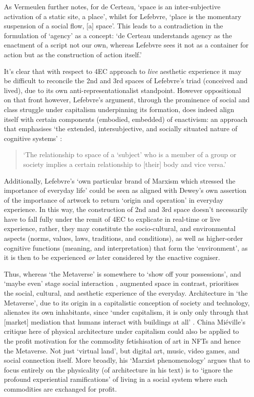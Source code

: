 As Vermeulen further notes, for de Certeau, `space is an inter-subjective activation of a static site, a place', whilst for Lefebvre, `place is the momentary suspension of a social flow, [a] space'. This leads to a contradiction in the formulation of `agency' as a concept: `de Certeau understands agency as the enactment of a script not our own, whereas Lefebvre sees it not as a container for action but as the construction of action itself.' 

It's clear that with respect to 4EC approach to \textit{live} aesthetic experience it may be difficult to reconcile the 2nd and 3rd spaces of Lefebvre's triad (conceived and lived), due to its own anti-representationalist standpoint. However oppositional on that front however, Lefebvre's argument, through the prominence of social and class struggle under capitalism underpinning its formation, does indeed align itself with certain components (embodied, embedded) of enactivism: an approach that emphasises `the extended, intersubjective, and socially situated nature of cognitive systems' \citep[p. 6]{gallagher2017}: 
\begin{quote}
    `The relationship to space of a `subject' who is a member of a group or society implies a certain relationship to [their] body and vice versa.' \cite[p. 40]{lefebvre1991}
\end{quote}
Additionally, Lefebvre's `own particular brand of Marxism which stressed the importance of everyday life' \citep[p. 8]{merrifield1993} could be seen as aligned with Dewey's own assertion of the importance of artwork to return `origin and operation' in everyday experience. In this way, the construction of 2nd and 3rd space doesn't necessarily have to fall fully under the remit of 4EC to explicate in real-time or live experience, rather, they may constitute the socio-cultural, and environmental aspects (norms, values, laws, traditions, and conditions), as well as higher-order cognitive functions (meaning, and interpretation) that form the `environment', as it is then to be experienced \textit{or} later considered by the enactive cogniser.

Thus, whereas `the Metaverse' is somewhere to `show off your possessions', and `maybe even' stage social interaction \citep{marr2022}, augmented space in contrast, prioritises the social, cultural, and aesthetic experience of the everyday. Architecture in `the Metaverse', due to its origin in a capitalistic conception of society and technology, alienates its own inhabitants, since `under capitalism, it is only only through that [market] mediation that humans interact with buildings at all' \citep[p. 18]{mieville1998}. China Miéville's critique here of physical architecture under capitalism could also be applied to the profit motivation for the commodity fetishisation of art in NFTs and hence the Metaverse. Not just `virtual land', but digital art, music, video games, and social connection itself. More broadly, his `Marxist phenomenology' argues that to focus entirely on the physicality (of architecture in his text) is to `ignore the profound experiential ramifications' of living in a social system where such commodities are exchanged for profit. 

